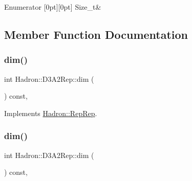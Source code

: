 \begin{DoxyEnumFields}{Enumerator}
[0pt][0pt]{}\mbox{\label{structHadron_1_1D3A2Rep_a4ed514a4e3b8e3c5e98963e3212f1defa2a16223c20702a6ce2e3c613c6380720}} 
Size\+\_\+t&\\
\hline

\end{DoxyEnumFields}


\subsection{Member Function Documentation}
\mbox{\label{structHadron_1_1D3A2Rep_a38d0163b1fb9994be68c43d2bfc90ce4}} 
\subsubsection{\texorpdfstring{dim()}{dim()}\hspace{0.1cm}{\footnotesize\ttfamily [1/3]}}
{\footnotesize\ttfamily int Hadron\+::\+D3\+A2\+Rep\+::dim (\begin{DoxyParamCaption}{ }\end{DoxyParamCaption}) const\hspace{0.3cm}{\ttfamily [inline]}, {\ttfamily [virtual]}}



Implements \mbox{\hyperlink{structHadron_1_1RepRep_a92c8802e5ed7afd7da43ccfd5b7cd92b}{Hadron\+::\+Rep\+Rep}}.

\mbox{\label{structHadron_1_1D3A2Rep_a38d0163b1fb9994be68c43d2bfc90ce4}} 
\subsubsection{\texorpdfstring{dim()}{dim()}\hspace{0.1cm}{\footnotesize\ttfamily [2/3]}}
{\footnotesize\ttfamily int Hadron\+::\+D3\+A2\+Rep\+::dim (\begin{DoxyParamCaption}{ }\end{DoxyParamCaption}) const\hspace{0.3cm}{\ttfamily [inline]}, {\ttfamily [virtual]}}



